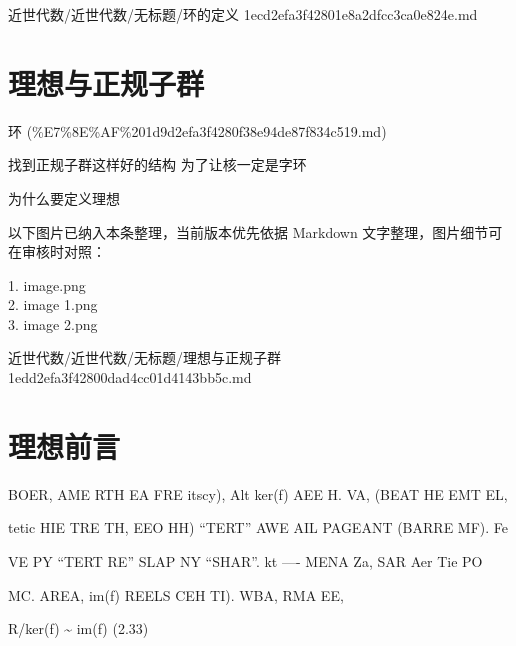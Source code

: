 \begin{note}[来源路径]

近世代数/近世代数/无标题/环的定义 1ecd2efa3f42801e8a2dfcc3ca0e824e.md

\end{note}

\section*{理想与正规子群}

\begin{note}[来源上级主题]

环 (\%E7\%8E\%AF\%201d9d2efa3f4280f38e94de87f834c519.md)

\end{note}

\begin{note}[理想与正规子群]

找到正规子群这样好的结构 为了让核一定是字环

为什么要定义理想

\end{note}

\begin{note}[关联图片]
以下图片已纳入本条整理，当前版本优先依据 Markdown 文字整理，图片细节可在审核时对照：

1. image.png\\
2. image 1.png\\
3. image 2.png\\

\end{note}

\begin{note}[来源路径]

近世代数/近世代数/无标题/理想与正规子群 1edd2efa3f42800dad4cc01d4143bb5c.md

\end{note}

\section*{理想前言}

\begin{note}[理想前言]

BOER, AME RTH EA FRE itscy), Alt ker(f) AEE H. VA, (BEAT HE EMT EL,

tetic HIE TRE TH, EEO HH) “TERT” AWE AIL PAGEANT (BARRE MF). Fe

VE PY “TERT RE” SLAP NY “SHAR”. kt —- MENA Za, SAR Aer Tie PO

MC. AREA, im(f) REELS CEH TI). WBA, RMA EE,

R/ker(f) \textasciitilde{} im(f)                                              (2.33)

\end{note}

